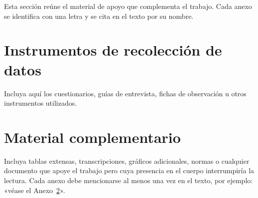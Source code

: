 \clearpage
{}

Esta sección reúne el material de apoyo que complementa el trabajo. Cada anexo
se identifica con una letra y se cita en el texto por su nombre.

\appendix
\renewcommand{\appendixname}{Anexo}
\renewcommand{\chaptername}{Anexo}


\chapter{Instrumentos de recolección de datos}
\label{anx:instrumentos}

Incluya aquí los cuestionarios, guías de entrevista, fichas de observación u
otros instrumentos utilizados.

\chapter{Material complementario}
\label{anx:complementario}

Incluya tablas extensas, transcripciones, gráficos adicionales, normas o
cualquier documento que apoye el trabajo pero cuya presencia en el cuerpo
interrumpiría la lectura. Cada anexo debe mencionarse al menos una vez en el
texto, por ejemplo: «véase el Anexo~\ref{anx:complementario}».
